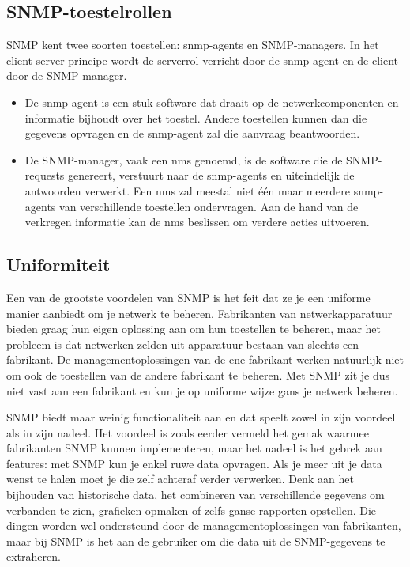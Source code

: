 \subsection{SNMP-toestelrollen}
\label{snmp-rollen}

SNMP kent twee soorten toestellen: \glspl{snmp-agent} en SNMP-managers.
In het client-server principe wordt de serverrol verricht door de \gls{snmp-agent} en de client door de SNMP-manager.

\begin{itemize}
	\item De \gls{snmp-agent} is een stuk software dat draait op de netwerkcomponenten en informatie bijhoudt over het toestel.
	Andere toestellen kunnen dan die gegevens opvragen en de \gls{snmp-agent} zal die aanvraag beantwoorden.
	
	\item De SNMP-manager, vaak een  \gls{nms} genoemd, is de software die de SNMP-requests genereert, verstuurt naar de
	\glspl{snmp-agent} en uiteindelijk de antwoorden verwerkt. Een \gls{nms} zal meestal niet één maar meerdere \glspl{snmp-agent} van verschillende toestellen ondervragen.
	Aan de hand van de verkregen informatie kan de \gls{nms} beslissen om verdere acties uitvoeren.
\end{itemize}


\subsection{Uniformiteit}

Een van de grootste voordelen van SNMP is het feit dat ze je een uniforme manier aanbiedt om je netwerk te beheren. Fabrikanten van netwerkapparatuur
bieden graag hun eigen oplossing aan om hun toestellen te beheren, maar het probleem is dat netwerken zelden uit apparatuur
bestaan van slechts een fabrikant. De managementoplossingen van de ene fabrikant werken natuurlijk niet om ook de toestellen van de andere
fabrikant te beheren. Met SNMP zit je dus niet vast aan een fabrikant en kun je op uniforme wijze gans je netwerk beheren.

SNMP biedt maar weinig functionaliteit aan en dat speelt zowel in zijn voordeel als in zijn nadeel.
Het voordeel is zoals eerder vermeld het gemak waarmee fabrikanten SNMP kunnen implementeren,
maar het nadeel is het gebrek aan features: met SNMP kun je enkel ruwe data opvragen.
Als je meer uit je data wenst te halen moet je die zelf achteraf verder verwerken. Denk aan het bijhouden van historische data, het combineren
van verschillende gegevens om verbanden te zien, grafieken opmaken of zelfs ganse rapporten opstellen. Die dingen worden wel ondersteund door de
managementoplossingen van fabrikanten, maar bij SNMP is het aan de gebruiker om die data uit de SNMP-gegevens te extraheren.


